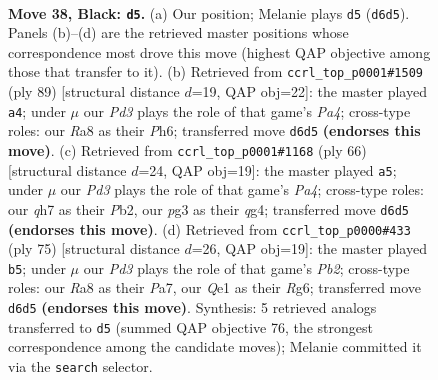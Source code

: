 \documentclass[11pt]{article}
\begin{document}
\clearpage

\begin{figure}[p]\centering
\begin{subfigure}{0.46\textwidth}\centering
\resizebox{\linewidth}{!}{%
\newchessgame
\chessboard[
  setfen={r7/7Q/3pkp2/8/p7/6P1/P4PKP/4q3 b - - 2 38},
  showmover=false,
  pgfstyle=straightmove, color=movearrow, markmove={d6-d5}
]}
\caption{}
\end{subfigure}\hfill
\begin{subfigure}{0.46\textwidth}\centering
\resizebox{\linewidth}{!}{%
\newchessgame
\chessboard[
  setfen={8/6pk/4Q2p/p7/8/3qP2P/5PPK/8 b - - 1 45},
  showmover=false,
  pgfstyle=straightmove, color=movearrow, markmove={a5-a4}
]}
\caption{}
\end{subfigure}
\\[4pt]
\begin{subfigure}{0.46\textwidth}\centering
\resizebox{\linewidth}{!}{%
\newchessgame
\chessboard[
  setfen={6k1/5pp1/7p/1Qp5/P5q1/8/KP3P2/8 w - - 0 34},
  showmover=false,
  pgfstyle=straightmove, color=movearrow, markmove={a4-a5}
]}
\caption{}
\end{subfigure}\hfill
\begin{subfigure}{0.46\textwidth}\centering
\resizebox{\linewidth}{!}{%
\newchessgame
\chessboard[
  setfen={8/pp1k4/3p2r1/2p3PR/8/1P6/PKP5/8 b - - 2 38},
  showmover=false,
  pgfstyle=straightmove, color=movearrow, markmove={b7-b5}
]}
\caption{}
\end{subfigure}
\caption{\textbf{Move 38, Black: \texttt{d5}.} (a) Our position; Melanie plays \texttt{d5} (\texttt{d6d5}). Panels (b)--(d) are the retrieved master positions whose correspondence most drove this move (highest QAP objective among those that transfer to it). (b) Retrieved from \texttt{ccrl\_top\_p0001\#1509} (ply 89) [structural distance $d$=19, QAP obj=22]: the master played \texttt{a4}; under $\mu$ our \emph{Pd3} plays the role of that game's \emph{Pa4}; cross-type roles: our \emph{R}a8 as their \emph{P}h6; transferred move \texttt{d6d5} \textbf{(endorses this move)}. (c) Retrieved from \texttt{ccrl\_top\_p0001\#1168} (ply 66) [structural distance $d$=24, QAP obj=19]: the master played \texttt{a5}; under $\mu$ our \emph{Pd3} plays the role of that game's \emph{Pa4}; cross-type roles: our \emph{q}h7 as their \emph{P}b2, our \emph{p}g3 as their \emph{q}g4; transferred move \texttt{d6d5} \textbf{(endorses this move)}. (d) Retrieved from \texttt{ccrl\_top\_p0000\#433} (ply 75) [structural distance $d$=26, QAP obj=19]: the master played \texttt{b5}; under $\mu$ our \emph{Pd3} plays the role of that game's \emph{Pb2}; cross-type roles: our \emph{R}a8 as their \emph{P}a7, our \emph{Q}e1 as their \emph{R}g6; transferred move \texttt{d6d5} \textbf{(endorses this move)}. Synthesis: 5 retrieved analogs transferred to \texttt{d5} (summed QAP objective 76, the strongest correspondence among the candidate moves); Melanie committed it via the \texttt{search} selector.}
\label{fig:thought-m75}
\end{figure}
\end{document}
